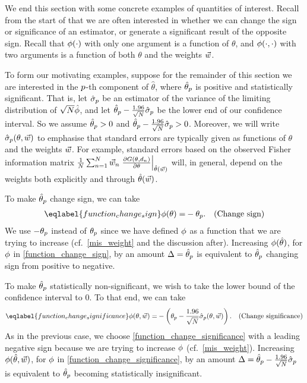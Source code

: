 We end this section with some concrete examples of quantities of interest.
Recall from the start of  that we are often interested in whether we
can change the sign or significance of an estimator, or generate a significant
result of the opposite sign. Recall that $\phi(\cdot)$ with only one
argument is a function of $\theta$, and $\phi(\cdot, \cdot)$ with two
arguments is a function of both $\theta$ and the weights $\vec{w}$.

To form our motivating examples, suppose for the remainder of this section we
are interested in the $p$-th component of $\hat\theta$, where $\hat{\theta}_{p}$
is positive and statistically significant.  That is, let $\hat\sigma_{p}$ be an
estimator of the variance of the limiting distribution of
$\sqrt{N}\hat{\phi}$, and let $\hat{\theta}_p - \frac{1.96}{\sqrt{N}}
\hat\sigma_{p}$ be the lower end of our confidence interval. So we assume
$\hat{\theta}_p > 0$ and $\hat{\theta}_p - \frac{1.96}{\sqrt{N}} \hat\sigma_{p} > 0$.
Moreover, we will write $\hat\sigma_{p}(\theta, \vec{w})$ to emphasise that standard
errors are typically given as functions of $\theta$ and the weights $\vec{w}$.  For
example, standard errors based on the observed Fisher information matrix $\frac{1}{N}\sum_{n=1}^N
\vec{w}_n \left.\frac{\partial G(\theta, d_n)}{\partial \theta}\right|_{\hat{\theta}(\vec{w})}$ will, in
general, depend on the weights both explicitly and through $\hat{\theta}(\vec{w})$.

To make $\hat{\theta}_{p}$ change sign, we can take
%
\begin{align} \eqlabel{function_change_sign}
%
\thetafun(\theta) =&
- \theta_{\p}.
& \textrm{(Change sign)}
%
\end{align}
%
We use $-\theta_{p}$ instead of $\theta_{p}$ since we have defined $\phi$
as a function that we are trying to increase (cf.\ \eqref{mis_weight} and the
discussion after). Increasing $\phi(\hat{\theta})$, for $\phi$ in
\eqref{function_change_sign}, by an amount $\Delta = \hat{\theta}_{p}$ is
equivalent to $\hat{\theta}_{p}$ changing sign from positive to negative.

To make $\hat{\theta}_{p}$ statistically non-significant, we wish
to take the lower bound of the confidence interval to $0$. To that end, we can take
%
\begin{align} \eqlabel{function_change_significance}
%
\thetafun(\theta, \w) =&
- \left(\theta_{\p} - \frac{1.96}{\sqrt{N}} \hat\sigma_{\p}(\theta, \w) \right).
& \textrm{(Change significance)}
%
\end{align}
%
As in the previous case, we choose \eqref{function_change_significance} with a
leading negative sign because we are trying to increase $\phi$ (cf.\
\eqref{mis_weight}). Increasing $\phi(\hat{\theta}, \vec{w})$, for $\phi$ in
\eqref{function_change_significance}, by an amount $\Delta = \hat{\theta}_{p} -
\frac{1.96}{\sqrt{N}} \hat\sigma_{p}$ is equivalent to $\hat{\theta}_{p}$
becoming statistically insignificant.

